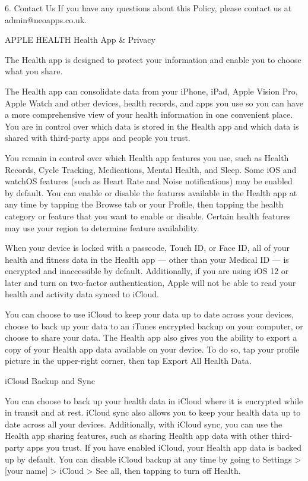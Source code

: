 6. Contact Us
If you have any questions about this Policy, please contact us at admin@neoapps.co.uk.


APPLE HEALTH 
Health App & Privacy

The Health app is designed to protect your information and enable you to choose what you share.



The Health app can consolidate data from your iPhone, iPad, Apple Vision Pro, Apple Watch and other devices, health records, and apps you use so you can have a more comprehensive view of your health information in one convenient place. You are in control over which data is stored in the Health app and which data is shared with third-party apps and people you trust.

You remain in control over which Health app features you use, such as Health Records, Cycle Tracking, Medications, Mental Health, and Sleep. Some iOS and watchOS features (such as Heart Rate and Noise notifications) may be enabled by default. You can enable or disable the features available in the Health app at any time by tapping the Browse tab or your Profile, then tapping the health category or feature that you want to enable or disable. Certain health features may use your region to determine feature availability.

When your device is locked with a passcode, Touch ID, or Face ID, all of your health and fitness data in the Health app — other than your Medical ID — is encrypted and inaccessible by default. Additionally, if you are using iOS 12 or later and turn on two-factor authentication, Apple will not be able to read your health and activity data synced to iCloud.

You can choose to use iCloud to keep your data up to date across your devices, choose to back up your data to an iTunes encrypted backup on your computer, or choose to share your data. The Health app also gives you the ability to export a copy of your Health app data available on your device. To do so, tap your profile picture in the upper-right corner, then tap Export All Health Data.

iCloud Backup and Sync

You can choose to back up your health data in iCloud where it is encrypted while in transit and at rest. iCloud sync also allows you to keep your health data up to date across all your devices. Additionally, with iCloud sync, you can use the Health app sharing features, such as sharing Health app data with other third-party apps you trust. If you have enabled iCloud, your Health app data is backed up by default. You can disable iCloud backup at any time by going to Settings > [your name] > iCloud > See all, then tapping to turn off Health.

